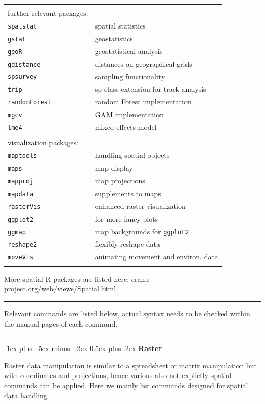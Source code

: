 \documentclass[a4paper,10pt,landscape]{article}
\makeatletter
\renewcommand{\section}{\@startsection{section}{1}{0mm}%
                                {-1ex plus -.5ex minus -.2ex}%
                                {0.5ex plus .2ex}%
                                {\normalfont\large\bfseries}}
\makeatother
\begin{document}
\begin{multicols}{3}
\begin{tabular}{@{}p{\the\MyLen}%
		@{}p{\linewidth-\the\MyLen}@{}}
& \\
further relevant packages:\\
% 
\verb!spatstat!  & spatial statistics\\
\verb!gstat!  & geostatistics\\
\verb!geoR!  & geostatistical analysis\\
\verb!gdistance!  & distances on geographical grids\\
\verb!spsurvey!  & sampling functionality\\
\verb!trip!  & sp class extension for track analysis\\
\verb!randomForest!  & random Forest implementation\\
\verb!mgcv!  & GAM implementation\\
\verb!lme4!  & mixed-effects model\\
% 
& \\
visualization packages:\\
\verb!maptools!  & handling spatial objects\\
\verb!maps!  & map display\\
\verb!mapproj!  & map projections\\
\verb!mapdata!  & supplements to maps\\
\verb!rasterVis!  & enhanced raster visualization\\
\verb!ggplot2!  & for more fancy plots\\
\verb!ggmap!  & map backgrounds for \verb!ggplot2!\\
\verb!reshape2!  & flexibly reshape data \\
\verb!moveVis!  & animating movement and environ. data \\
 & 
\end{tabular}

More spatial R packages are listed here: cran.r-project.org/web/views/Spatial.html

\rule{0.32\textwidth}{0.4pt}
Relevant commands are listed below, actual syntax needs to be checked within the manual pages of each command. 
\rule{0.32\textwidth}{0.4pt}



\section{\textbf{Raster}}

Raster data manipulation is similar to a spreadsheet or matrix manipulation but with coordinates and projections, hence various also not explictly spatial commands can be applied. Here we  mainly list commands designed for spatial data handling.


\end{multicols}
\end{document}
